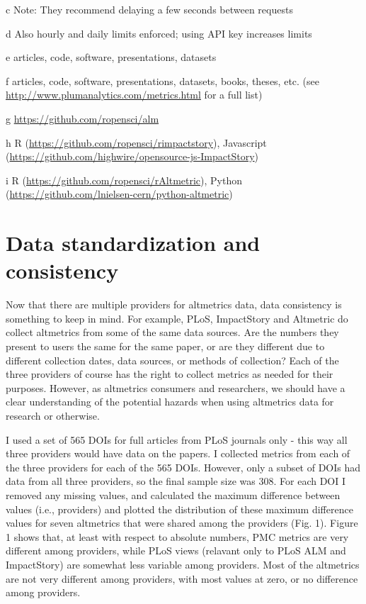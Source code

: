 \documentclass[letterpaper,superscriptaddress,showkeys,longbibliography]{revtex4-1}\usepackage{graphicx, color}
\begin{document}
\begin{table}[!ht]
\begin{threeparttable}[b]
\begin{tablenotes}
            \item[c] Note: They recommend delaying a few seconds between requests
            \item[d] Also hourly and daily limits enforced; using API key increases limits
            \item[e] articles, code, software, presentations, datasets
            \item[f] articles, code, software, presentations, datasets, books, theses, etc. (see \url{http://www.plumanalytics.com/metrics.html} for a full list)
            \item[g] \url{https://github.com/ropensci/alm}
            \item[h] R (\url{https://github.com/ropensci/rimpactstory}), Javascript (\url{https://github.com/highwire/opensource-js-ImpactStory})
            \item[i] R (\url{https://github.com/ropensci/rAltmetric}), Python (\url{https://github.com/lnielsen-cern/python-altmetric})
        \end{tablenotes}
    \end{threeparttable}
\end{table}

\section*{Data standardization and consistency}

Now that there are multiple providers for altmetrics data, data consistency is something to keep in mind. For example, PLoS, ImpactStory and Altmetric do collect altmetrics from some of the same data sources. Are the numbers they present to users the same for the same paper, or are they different due to different collection dates, data sources, or methods of collection? Each of the three providers of course has the right to collect metrics as needed for their purposes. However, as altmetrics consumers and researchers, we should have a clear understanding of the potential hazards when using altmetrics data for research or otherwise. 

I used a set of 565 DOIs for full articles from PLoS journals only - this way all three providers would have data on the papers. I collected metrics from each of the three providers for each of the 565 DOIs. However, only a subset of DOIs had data from all three providers, so the final sample size was 308. For each DOI I removed any missing values, and calculated the maximum difference between values (i.e., providers) and plotted the distribution of these maximum difference values for seven altmetrics that were shared among the providers (Fig. 1). Figure 1 shows that, at least with respect to absolute numbers, PMC metrics are very different among providers, while PLoS views (relavant only to PLoS ALM and ImpactStory) are somewhat less variable among providers. Most of the altmetrics are not very different among providers, with most values at zero, or no difference among providers. 
\end{document}
